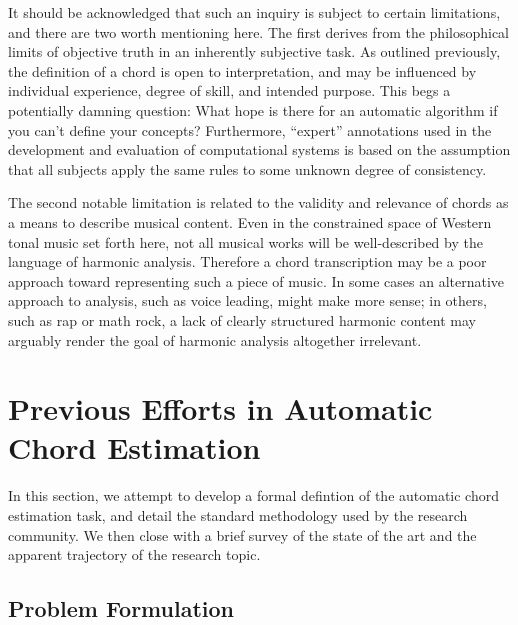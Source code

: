 It should be acknowledged that such an inquiry is subject to certain limitations, and there are two worth mentioning here.
The first derives from the philosophical limits of objective truth in an inherently subjective task.
As outlined previously, the definition of a chord is open to interpretation, and may be influenced by individual experience, degree of skill, and intended purpose.
This begs a potentially damning question: What hope is there for an automatic algorithm if you can't define your concepts?
Furthermore, ``expert'' annotations used in the development and evaluation of computational systems is based on the assumption that all subjects apply the same rules to some unknown degree of consistency.

The second notable limitation is related to the validity and relevance of chords as a means to describe musical content.
Even in the constrained space of Western tonal music set forth here, not all musical works will be well-described by the language of harmonic analysis.
Therefore a chord transcription may be a poor approach toward representing such a piece of music.
In some cases an alternative approach to analysis, such as voice leading, might make more sense; in others, such as rap or math rock, a lack of clearly structured harmonic content may arguably render the goal of harmonic analysis altogether irrelevant.


\section{Previous Efforts in Automatic Chord Estimation}
\label{sec:background}

In this section, we attempt to develop a formal defintion of the automatic chord estimation task, and detail the standard methodology used by the research community.
We then close with a brief survey of the state of the art and the apparent trajectory of the research topic.


\subsection{Problem Formulation}
\label{subsec:problem_formulation}

